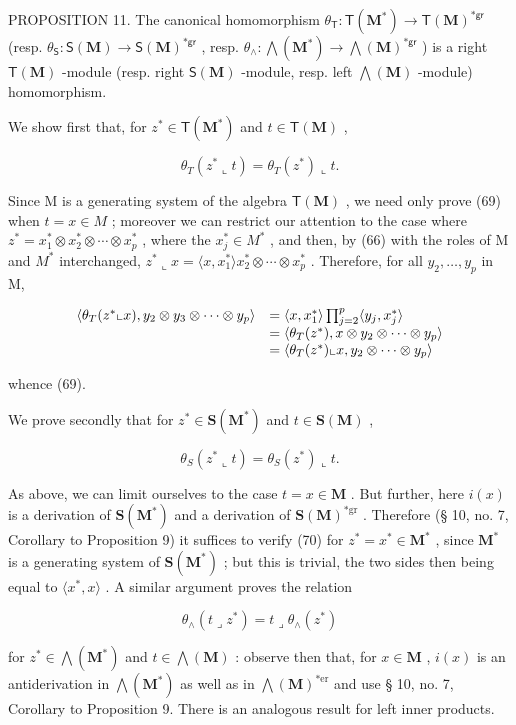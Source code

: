 PROPOSITION 11. The canonical homomorphism \(\theta_{\mathsf{T}}: \mathsf{T}(\mathbf{M}^{*}) \to \mathsf{T}(\mathbf{M})^{*\mathsf{gr}}\) (resp. \(\theta_{\mathsf{S}}: \mathsf{S}(\mathbf{M}) \to \mathsf{S}(\mathbf{M})^{*\mathsf{gr}}\) , resp. \(\theta_{\wedge}: \bigwedge (\mathbf{M}^{*}) \to \bigwedge (\mathbf{M})^{*\mathsf{gr}}\) ) is a right \(\mathsf{T}(\mathbf{M})\) -module (resp. right \(\mathsf{S}(\mathbf{M})\) -module, resp. left \(\bigwedge (\mathbf{M})\) -module) homomorphism.

We show first that, for \(z^{*} \in \mathsf{T}(\mathbf{M}^{*})\) and \(t \in \mathsf{T}(\mathbf{M})\) ,

\[
\theta_ {T} (z ^ {*} \llcorner t) = \theta_ {T} (z ^ {*}) \llcorner t.\tag{69}
\]

Since M is a generating system of the algebra \(\mathsf{T}(\mathbf{M})\) , we need only prove (69) when \(t = x \in M\) ; moreover we can restrict our attention to the case where \(z^{*} = x_{1}^{*} \otimes x_{2}^{*} \otimes \cdots \otimes x_{p}^{*}\) , where the \(x_{j}^{*} \in M^{*}\) , and then, by (66) with the roles of M and \(M^{*}\) interchanged, \(z^{*} \llcorner x = \langle x, x_{1}^{*} \rangle x_{2}^{*} \otimes \cdots \otimes x_{p}^{*}\) . Therefore, for all \(y_{2}, \ldots, y_{p}\) in M,

\[
\begin{array}{r l} \langle \theta_ {T} (z ^ {*} \llcorner x), y _ {2} \otimes y _ {3} \otimes \dots \otimes y _ {p} \rangle & = \langle x, x _ {1} ^ {*} \rangle \prod_ {j = 2} ^ {p} \langle y _ {j}, x _ {j} ^ {*} \rangle \\ & = \langle \theta_ {T} (z ^ {*}), x \otimes y _ {2} \otimes \dots \otimes y _ {p} \rangle \\ & = \langle \theta_ {T} (z ^ {*}) \llcorner x, y _ {2} \otimes \dots \otimes y _ {p} \rangle \end{array}
\]

whence (69).

We prove secondly that for \(z^{*} \in \mathbf{S}(\mathbf{M}^{*})\) and \(t \in \mathbf{S}(\mathbf{M})\) ,

\[
\theta_ {S} (z ^ {*} \llcorner t) = \theta_ {S} (z ^ {*}) \llcorner t.\tag{70}
\]

As above, we can limit ourselves to the case \(t = x \in \mathbf{M}\) . But further, here \(i(x)\) is a derivation of \(\mathbf{S}(\mathbf{M}^*)\) and a derivation of \(\mathbf{S}(\mathbf{M})^{*\text{gr}}\) . Therefore (§ 10, no. 7, Corollary to Proposition 9) it suffices to verify (70) for \(z^* = x^* \in \mathbf{M}^*\) , since \(\mathbf{M}^*\) is a generating system of \(\mathbf{S}(\mathbf{M}^*)\) ; but this is trivial, the two sides then being equal to \(\langle x^*, x \rangle\) . A similar argument proves the relation

\[
\theta_ {\wedge} (t \lrcorner z ^ {*}) = t \lrcorner \theta_ {\wedge} (z ^ {*})\tag{71}
\]

for \(z^{*} \in \bigwedge(\mathbf{M}^{*})\) and \(t \in \bigwedge(\mathbf{M})\) : observe then that, for \(x \in \mathbf{M}\) , \(i(x)\) is an antiderivation in \(\bigwedge(\mathbf{M}^{*})\) as well as in \(\bigwedge(\mathbf{M})^{*\text{er}}\) and use § 10, no. 7, Corollary to Proposition 9. There is an analogous result for left inner products.

